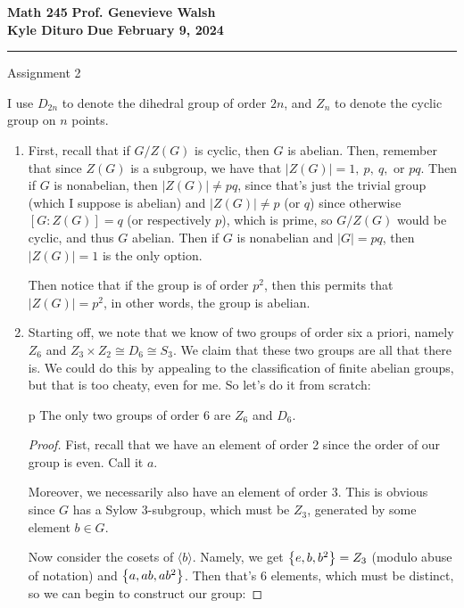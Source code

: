 \documentclass[12pt, twosided]{article}
\begin{document}
\noindent \textbf{Math 245} \hfill \textbf{Prof. Genevieve Walsh} \\
\textbf{Kyle Dituro} \hfill \textbf{Due February 9\tht, 2024}\hrule
\vspace{.2in}
\begin{center}
  {\huge Assignment 2}
\end{center}
\begin{notn}
  I use \(D_{2n}\) to denote the dihedral group of order \(2n\), and \(Z_n\) to denote the cyclic group on \(n\) points.
\end{notn}
\begin{enumerate}
\item First, recall that if \(G/Z(G)\) is cyclic, then \(G\) is abelian. Then, remember that since \(Z(G)\) is a subgroup, we have that \(|Z(G)| = 1,\ p,\ q,\) or \(pq\). Then if \(G\) is nonabelian, then \(|Z(G)| \neq pq\), since that's just the trivial group (which I suppose is abelian) and \(|Z(G)| \neq p\) (or \(q\)) since otherwise \([G : Z(G)] = q\) (or respectively \(p\)), which is prime, so \(G/Z(G)\) would be cyclic, and thus \(G\) abelian. Then if \(G\) is nonabelian and \(|G|=pq\), then \(|Z(G)| = 1\) is the only option.

  Then notice that if the group is of order \(p^2\), then this permits that \(|Z(G)|=p^2\), in other words, the group is abelian.
\item Starting off, we note that we know of two groups of order six a priori, namely \(Z_6\) and \(Z_3 \times Z_2 \cong D_6 \cong S_3\). We claim that these two groups are all that there is. We could do this by appealing to the classification of finite abelian groups, but that is too cheaty, even for me. So let's do it from scratch:
  \begin{clm}
p    The only two groups of order 6 are \(Z_6\) and \(D_6\).
  \end{clm}
  \begin{proof}
    Fist, recall that we have an element of order 2 since the order of our group is even. Call it \(a\).
    
    Moreover, we necessarily also have an  element of order 3. This is obvious since \(G\) has a Sylow 3-subgroup, which must be \(Z_3\), generated by some element \(b \in G\).

    Now consider the cosets of \(\langle b \rangle\). Namely, we get \(\left\{ e, b ,b^2 \right\} = Z_3\) (modulo abuse of notation) and \(\left\{ a, ab, ab^2\right\}\). Then that's 6 elements, which must be distinct, so we can begin to construct our group:


\end{proof}
\end{enumerate}
\end{document}
